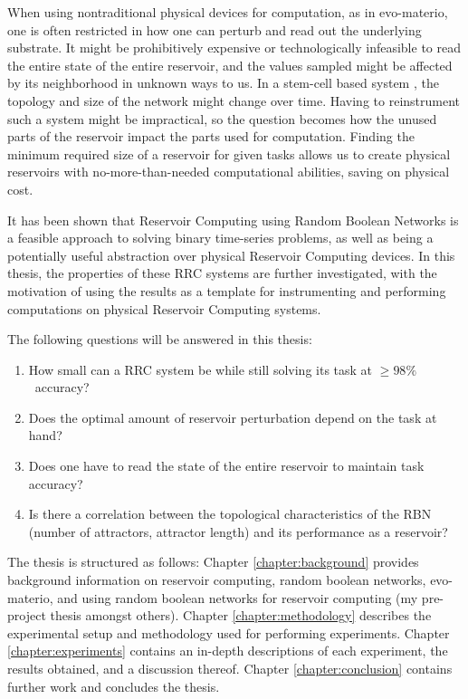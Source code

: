 When using nontraditional physical devices for computation, as in evo-materio,
one is often restricted in how one can perturb and read out the underlying substrate.
It might be prohibitively expensive or technologically infeasible to read the entire state of the entire reservoir,
and the values sampled might be affected by its neighborhood in unknown ways to us.
In a stem-cell based system ,
the topology and size of the network might change over time.
Having to reinstrument such a system might be impractical,
so the question becomes how the unused parts of the reservoir impact the parts used for computation.
Finding the minimum required size of a reservoir for given tasks allows us to create physical reservoirs with no-more-than-needed computational abilities,
saving on physical cost.

It has been shown that Reservoir Computing using Random Boolean Networks is a feasible approach to solving binary time-series problems,
as well as being a potentially useful abstraction over physical Reservoir Computing devices.
In this thesis, the properties of these RRC systems are further investigated,
with the motivation of using the results as a template for instrumenting and performing computations on physical Reservoir Computing systems.

The following questions will be answered in this thesis:
\begin{enumerate}
    \item How small can a RRC system be while still solving its task at $ \geq 98\% $ accuracy?
    \item Does the optimal amount of reservoir perturbation depend on the task at hand?
    \item Does one have to read the state of the entire reservoir to maintain task accuracy?
    \item Is there a correlation between the topological characteristics of the RBN (number of attractors, attractor length) and its performance as a reservoir?
\end{enumerate}

The thesis is structured as follows:
Chapter \ref{chapter:background} provides background information on reservoir computing, random boolean networks, evo-materio, and using random boolean networks for reservoir computing (my pre-project thesis amongst others).
Chapter \ref{chapter:methodology} describes the experimental setup and methodology used for performing experiments.
Chapter \ref{chapter:experiments} contains an in-depth descriptions of each experiment,
the results obtained, and a discussion thereof.
Chapter \ref{chapter:conclusion} contains further work and concludes the thesis.

\cleardoublepage
